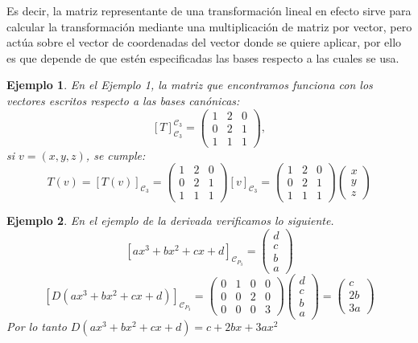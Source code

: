 \documentclass[12pt]{book}
\newtheorem{ejem}{Ejemplo}
\def\Ccal{\mathcal{C}}
\begin{document}
Es decir, la matriz representante de una transformación lineal en efecto sirve para calcular la transformación mediante una multiplicación de matriz por vector, pero actúa sobre el vector de coordenadas del vector donde se quiere aplicar, por ello es que depende de que estén especificadas las bases respecto a las cuales se usa.

\begin{ejem}
En el Ejemplo 1, la matriz que encontramos funciona con los vectores escritos respecto a las bases canónicas:
$$[T]_{\Ccal_3}^{\Ccal_3}=\left(\begin{array}{ccc} 1 & 2 & 0 \\ 0 &2 &1 \\ 1 & 1 & 1\end{array}\right),$$
si $v=(x,y,z)$, se cumple:
$$T(v)=[T(v)]_{\Ccal_3}=\left(\begin{array}{ccc} 1 & 2 & 0 \\ 0 &2 &1 \\ 1 & 1 & 1\end{array}\right)[v]_{\Ccal_3}=\left(\begin{array}{ccc} 1 & 2 & 0 \\ 0 &2 &1 \\ 1 & 1 & 1\end{array}\right)\left(\begin{array}{c} x\\y \\ z\end{array}\right)$$
\end{ejem}

\begin{ejem}
En el ejemplo de la derivada verificamos lo siguiente.
$$[ax^3+bx^2+cx+d]_{\Ccal_{P_3}}=
\left(\begin{array}{c} d\\c \\ b\\ a\end{array}\right)$$
$$[D(ax^3+bx^2+cx+d)]_{\Ccal_{P_3}}=
\left(\begin{array}{cccc}
0&1&0&0\\
0&0&2&0\\
0&0&0&3
\end{array}\right)
\left(\begin{array}{c} d\\c \\ b\\ a\end{array}\right)=
\left(\begin{array}{c} c\\2b \\ 3a\end{array}\right)
$$
Por lo tanto $D(ax^3+bx^2+cx+d)=c+2bx+3ax^2$
\end{ejem}
\end{document}
